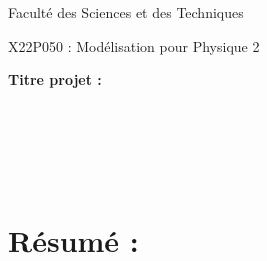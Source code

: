 \documentclass[a4paper,11pt]{article}			%
\begin{document}
\vspace*{-2cm}

\centerline{\LARGE Faculté des Sciences et des Techniques}
  \vspace*{0.5cm}  
\centerline{\LARGE X22P050 : Modélisation pour Physique  2 }  
\vspace*{0.5cm}  

\centerline{\bf\Large Titre projet :}
\vspace*{2cm}
\noindent
{}\\   \\
\vspace*{2cm}
\\   \\


\section*{Résumé :}
\end{document}
